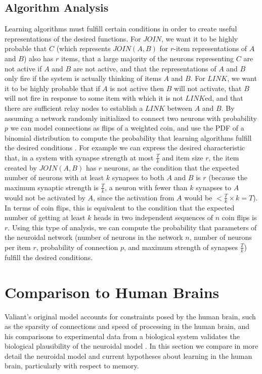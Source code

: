 \documentclass[letterpaper, 12pt]{article}
\begin{document}
\subsection{Algorithm Analysis}
Learning algorithms must fulfill certain conditions in order to create useful representations of the desired functions. For $JOIN$, we want it to be highly probable that $C$ (which represents $JOIN(A,B)$ for $r$-item representations of $A$ and $B$) also has $r$ items, that a large majority of the neurons representing $C$ are not active if $A$ and $B$ are not active, and that the representations of $A$ and $B$ only fire if the system is actually thinking of items $A$ and $B$. For $LINK$, we want it to be highly probable that if $A$ is not active then $B$ will not activate, that $B$ will not fire in response to some item with which it is not $LINK$ed, and that there are sufficient relay nodes to establish a $LINK$ between $A$ and $B$. By assuming a network randomly initialized to connect two neurons with probability $p$ we can model connections as flips of a weighted coin, and use the PDF of a binomial distribution to compute the probability that learning algorithms fulfill the desired conditions \cite{valiant_memorization_2005}. For example we can express the desired characteristic that, in a system with synapse strength at most $\frac{T}{k}$ and item size $r$, the item created by $JOIN(A, B)$ has $r$ neurons, as the condition that the expected number of neurons with at least $k$ synapses to both $A$ and $B$ is $r$ (because the maximum synaptic strength is $\frac{T}{k}$, a neuron with fewer than $k$ synapses to $A$ would not be activated by $A$, since the activation from $A$ would be $<\frac{T}{k}\times k=T$). In terms of coin flips, this is equivalent to the condition that the expected number of getting at least $k$ heads in two independent sequences of $n$ coin flips is $r$. Using this type of analysis, we can compute the probability that parameters of the neuroidal network (number of neurons in the network $n$, number of neurons per item $r$, probability of connection $p$, and maximum strength of synapses $\frac{T}{k}$) fulfill the desired conditions.

\section{Comparison to Human Brains}
Valiant's original model accounts for constraints posed by the human brain, such as the sparsity of connections and speed of processing in the human brain, and his comparisons to experimental data from a biological system validates the biological plausibility of the neuroidal model \cite{valiant_quantitative_2006}. In this section we compare in more detail the neuroidal model and current hypotheses about learning in the human brain, particularly with respect to memory.
\end{document}

